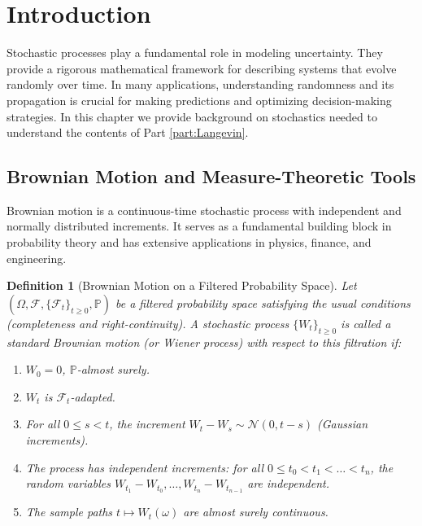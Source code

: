 \documentclass[11pt, twoside]{report}
\newtheorem{definition}[theorem]{Definition}
\begin{document}
\section{Introduction}
Stochastic processes play a fundamental role in modeling uncertainty. They provide a rigorous mathematical framework for describing systems that evolve randomly over time. In many applications, understanding randomness and its propagation is crucial for making predictions and optimizing decision-making strategies. In this chapter we provide background on stochastics needed to understand the contents of Part \ref{part:Langevin}.





\subsection{Brownian Motion and Measure-Theoretic Tools}
Brownian motion is a continuous-time stochastic process with independent and normally distributed increments. It serves as a fundamental building block in probability theory and has extensive applications in physics, finance, and engineering.

\begin{definition}[Brownian Motion on a Filtered Probability Space]
Let $(\Omega, \mathcal{F}, \{\mathcal{F}_t\}_{t \geq 0}, \mathbb{P})$ be a filtered probability space satisfying the usual conditions (completeness and right-continuity). A stochastic process $\{W_t\}_{t \geq 0}$ is called a \emph{standard Brownian motion} (or \emph{Wiener process}) with respect to this filtration if:

\begin{enumerate}
    \item $W_0 = 0$, $\mathbb{P}$-almost surely.
    \item $W_t$ is $\mathcal{F}_t$-adapted.
    \item For all $0 \leq s < t$, the increment $W_t - W_s \sim \mathcal{N}(0, t-s)$ (Gaussian increments).
    \item The process has independent increments: for all $0 \le t_0 < t_1 < \dots < t_n$, the random variables $W_{t_1} - W_{t_0}, \dots, W_{t_n} - W_{t_{n-1}}$ are independent.
    \item The sample paths $t \mapsto W_t(\omega)$ are almost surely continuous.
\end{enumerate}
\end{definition}
\end{document}
